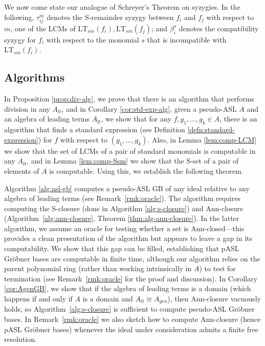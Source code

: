 \documentclass[11pt,reqno]{amsart}
\newcommand{\gb}{Gr\"{o}bner }
\newcommand{\ltsm}{\text{LT}_{sm}}
\theoremstyle{definition}
\numberwithin{equation}{section}
\begin{document}
We now come state our analogue of Schreyer's Theorem on syzygies. In the following, $\tau_{ij}^m$ denotes the S-remainder syzygy between $f_i$ and $f_j$ with respect to $m$, one of the LCMs of $\ltsm(f_i), \ltsm(f_j)$; and $\beta_i^s$ denotes the compatibility syzygy for $f_i$ with respect to the monomial $s$ that is incompatible with $\ltsm(f_i)$.


\subsection{Algorithms}

In Proposition \ref{prop:div-alg}, we prove that there is an algorithm that performs division in any $A_{lt}$, and in Corollary \ref{cor:std-exp-alg}, given a pseudo-ASL $A$ and an algebra of leading terms $A_{lt}$, we show that for any $f, g_1, \ldots, g_k \in A$, there is an algorithm that finds a standard expression (see Definition \ref{defn:standard-expression}) for $f$ with respect to $(g_1, \dotsc, g_k)$. Also, in Lemma \ref{lem:comp-LCM} we show that the set of LCMs of a pair of standard monomials is computable in any $A_{lt}$, and in Lemma \ref{lem:comp-Ssm} we show that the S-set of a pair of elements of $A$ is computable. Using this, we establish the following theorem.


Algorithm \ref{alg:asl-gb} computes a pseudo-ASL GB of any ideal relative to any algebra of leading terms (see Remark~\ref{rmk:oracle}). The algorithm requires computing the S-closure (done in Algorithm \ref{alg:s-closure}) and Ann-closure (Algorithm~\ref{alg:ann-closure}, Theorem \ref{thm:alg-ann-closure}). In the latter algorithm, we assume an oracle for testing whether a set is Ann-closed---this provides a clean presentation of the algorithm but appears to leave a gap in its computability. We show that this gap can be filled, establishing that pASL Gröbner bases are computable in finite time, although our algorithm relies on the parent polynomial ring (rather than working intrinsically in $A$) to test for termination (see Remark~\ref{rmk:oracle} for the proof and discussion). In Corollary \ref{cor:AgenGB}, we show that if the algebra of leading terms is a domain (which happens if and only if $A$ is a domain and $A_{lt} \cong A_{gen}$), then Ann-closure vacuously holds, so Algorithm~\ref{alg:s-closure} is sufficient to compute pseudo-ASL \gb bases. In Remark~\ref{rmk:oracle} we also sketch how to compute Ann-closure (hence pASL \gb bases) whenever the ideal under consideration admits a finite free resolution.
\end{document}
